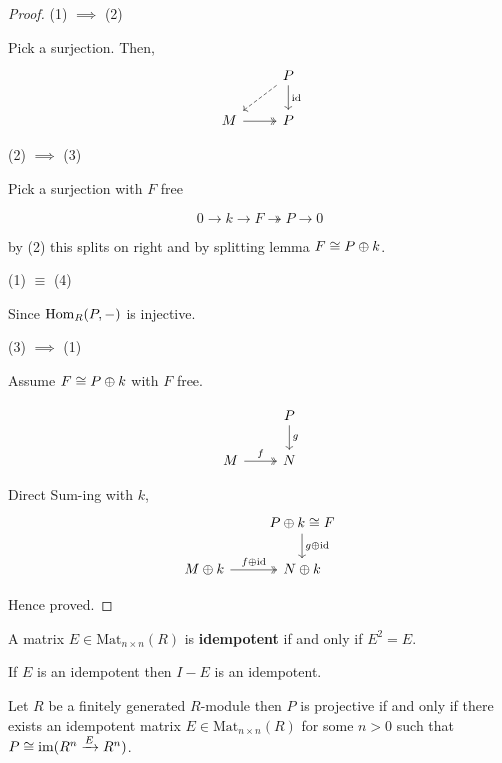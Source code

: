 \documentclass[12pt]{amsart}
\begin{document}
\begin{proof}
    (1) $\implies$ (2) 

    Pick a surjection. Then, 
    \[\begin{tikzcd}
        {} & P \arrow[d, "\id"] \ar[dl, dashed, swap] \\ 
        M \ar[r, two heads] & P
    \end{tikzcd}\]

    (2) $\implies$ (3)

    Pick a surjection with $F$ free 

    \[0 \to k \to F \twoheadrightarrow P \to 0\]

    by (2) this splits on right and by splitting lemma $F \cong P \oplus k$. 

    (1) $\equiv$ (4) 

    Since $\operatorname{Hom}_R(P, -)$ is injective. 

    (3) $\implies$ (1) 

    Assume $F \cong P \oplus k$ with $F$ free. 

    \[\begin{tikzcd}
        {} & P \arrow[d, "g"] \\ 
        M \ar[r, two heads, "f"] & N
    \end{tikzcd}\]

    Direct Sum-ing with $k$, 
    \[\begin{tikzcd}
        {} & P\oplus k \iso F\arrow[d, "g \oplus \id"] \\ 
        M \oplus k \ar[r, two heads, "f \oplus \id"] & N \oplus k
    \end{tikzcd}\]

    Hence proved.
\end{proof}

\begin{definition}
    A matrix $E \in \text{Mat}_{n \times n}(R)$ is \textbf{idempotent} if and only if $E^2 = E$. 
\end{definition}

\begin{remark}
    If $E$ is an idempotent then $I - E$ is an idempotent. 
\end{remark}

\begin{lemma}
    Let $R$ be a finitely generated $R$-module then $P$ is projective if and only if there exists an idempotent matrix $E \in \text{Mat}_{n \times n}(R)$ for some $n > 0$ such that $P \cong \operatorname{im}(R^n \xrightarrow{E} R^n)$. 
\end{lemma}
\end{document}
